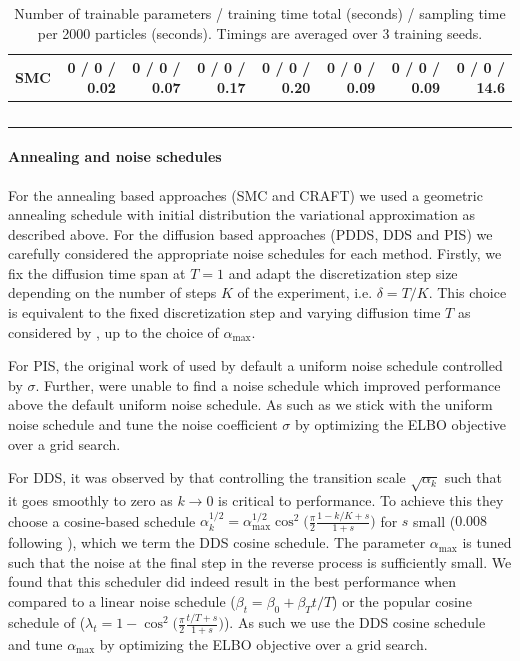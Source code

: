 \documentclass{article}
\theoremstyle{plain}
\theoremstyle{definition}
\theoremstyle{remark}
\begin{document}
\begin{table}[]
\begin{tabular}{lrrrrrrr}
		SMC   & 0 / 0 / 0.02      & 0 / 0 / 0.07 & 0 / 0 / 0.17 & 0 / 0 / 0.20  & 0 / 0 / 0.09 & 0 / 0 / 0.09 & 0 / 0 / 14.6 \\
		\bottomrule\
	\end{tabular}
	\caption{Number of trainable parameters / training time total (seconds) / sampling time per 2000 particles (seconds). Timings are averaged over 3 training seeds. }
	\label{tab:num_params}
\end{table}

\paragraph{Annealing and noise schedules} For the annealing based approaches (SMC and CRAFT) we used a geometric annealing schedule with initial distribution the variational approximation as described above. For the diffusion based approaches (PDDS, DDS and PIS) we carefully considered the appropriate noise schedules for each method. Firstly, we fix the diffusion time span at $T=1$ and adapt the discretization step size depending on the number of steps $K$ of the experiment, i.e. $\delta = T/K$. This choice is equivalent to the fixed discretization step and varying diffusion time $T$ as considered by \citet{vargasDDSampler2023}, up to the choice of $\alpha_\text{max}$.

For PIS, the original work of \citet{zhangyongxinchen2021path} used by default a uniform noise schedule controlled by $\sigma$. Further, \citet{vargasDDSampler2023} were unable to find a noise schedule which improved performance above the default uniform noise schedule. As such as we stick with the uniform noise schedule and tune the noise coefficient $\sigma$ by optimizing the ELBO objective over a grid search.%

For DDS, it was observed by \citet{vargasDDSampler2023} that controlling the transition scale $\sqrt{\alpha_k}$ such that it goes smoothly to zero as $k \to 0$ is critical to performance. To achieve this they choose a cosine-based schedule $\alpha_k^{1/2} = \alpha_{\text{max}}^{1/2} \cos^2\big(\frac{\pi}{2} \frac{1-k/K + s}{1+s}\big)$ for $s$ small ($0.008$ following \citet{nichol2021improved}), which we term the DDS cosine schedule. The parameter $\alpha_{\text{max}}$ is tuned such that the noise at the final step in the reverse process is sufficiently small. We found that this scheduler did indeed result in the best performance when compared to a linear noise schedule ($\beta_t = \beta_0 + \beta_T t/T$) or the popular cosine schedule of \citet{nichol2021improved} ($\lambda_t = 1 - \cos^2\big(\frac{\pi}{2} \frac{t/T + s}{1+s}\big)$). As such we use the DDS cosine schedule and tune $\alpha_{\text{max}}$ by optimizing the ELBO objective over a grid search. %
\end{document}
